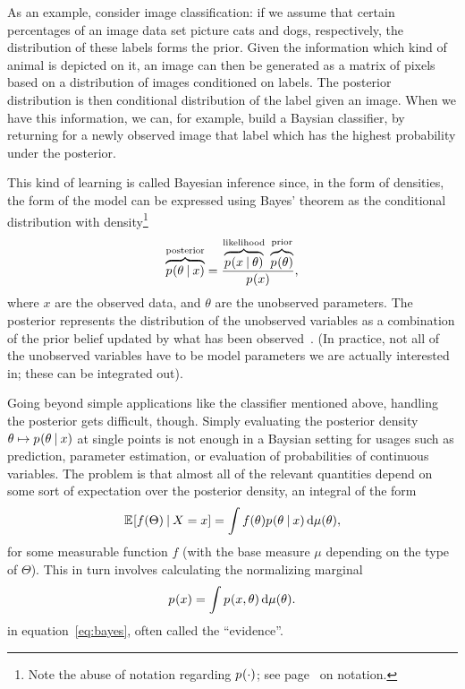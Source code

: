 As an example, consider image classification: if we assume that certain percentages of an image data
set picture cats and dogs, respectively, the distribution of these labels forms the prior.  Given
the information which kind of animal is depicted on it, an image can then be generated as a matrix
of pixels based on a distribution of images conditioned on labels.  The posterior distribution is
then conditional distribution of the label given an image.  When we have this information, we can,
for example, build a Baysian classifier, by returning for a newly observed image that label which
has the highest probability under the posterior.

This kind of learning is called Bayesian inference since, in the form of densities, the form of the
model can be expressed using Bayes' theorem as the conditional distribution with
density\footnote{Note the abuse of notation regarding \(\prob{\cdot}\); see
  page~\pageref{cha:notation} on notation.}
\begin{equation}
  \label{eq:bayes}
  \overbrace{\prob{\theta \given x}}^{\text{posterior}} =
  \frac{\overbrace{\prob{x \given \theta}}^{\text{likelihood}}\;
    \overbrace{\prob{\theta}}^{\text{prior}}}{\prob{x}},
\end{equation}
where \(x\) are the observed data, and \(\theta\) are the unobserved parameters. The posterior
represents the distribution of the unobserved variables as a combination of the prior belief updated
by what has been observed~\parencite{congdon2006bayesian}.  (In practice, not all of the unobserved
variables have to be model parameters we are actually interested in; these can be integrated out).

Going beyond simple applications like the classifier mentioned above, handling the posterior gets
difficult, though.  Simply evaluating the posterior density
\(\theta \mapsto \prob{\theta \given x}\) at single points is not enough in a Baysian setting for
usages such as prediction, parameter estimation, or evaluation of probabilities of continuous
variables.  The problem is that almost all of the relevant quantities depend on some sort of
expectation over the posterior density, an integral of the form
\begin{equation}
  \label{eq:posterior-expectation}
  \Exp{f(\Theta) \given X = x} = \int f(\theta) \prob{\theta \given x} \dif \mu(\theta),
\end{equation}
for some measurable function \(f\) (with the base measure \(\mu\) depending on the type of
\(\Theta\)). This in turn involves calculating the normalizing marginal
\begin{equation}
  \label{eq:normalizing}
  \prob{x} = \int \prob{x, \theta} \dif \mu(\theta).
\end{equation}
in equation~\eqref{eq:bayes}, often called the \enquote{evidence}.

